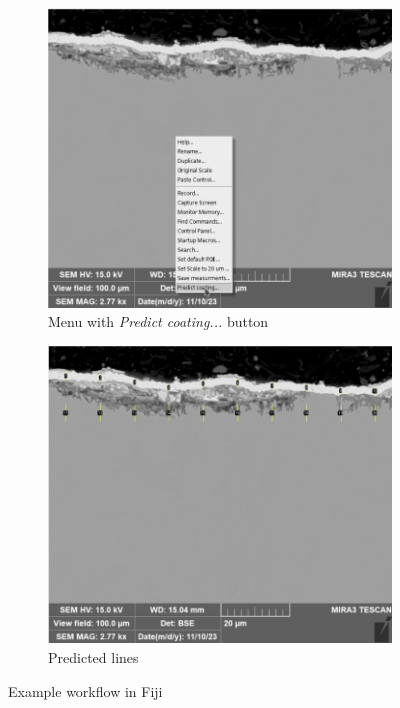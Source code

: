 \begin{figure}[ht]
    \centering
    \begin{subfigure}{0.45\textwidth}
        \centering
        \includegraphics[width=\linewidth]{PICTURES/fiji/frame-002.png}
        \caption{Menu with \textit{Predict coating...} button}
        \label{fig:enter-label-2}
    \end{subfigure}
    \begin{subfigure}{0.45\textwidth}
        \centering
        \includegraphics[width=\linewidth]{PICTURES/fiji/frame-003.png}
        \caption{Predicted lines}
        \label{fig:enter-label-3}
    \end{subfigure}
    \caption{Example workflow in Fiji}
    \label{fig:two-masks}
\end{figure}
\newpage

